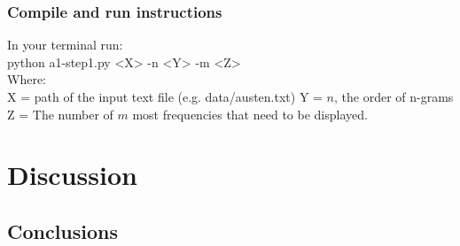\documentclass[final,12pt]{elsarticle}
\begin{document}
\subsubsection{Compile and run instructions}
In your terminal run:\\
python a1-step1.py <X> -n <Y> -m <Z>\\
Where:\\
X = path of the input text file (e.g. data/austen.txt)
Y = $n$, the order of n-grams
Z = The number of $m$ most frequencies that need to be displayed.
\section{Discussion}
\subsection{Conclusions}
\end{document}
